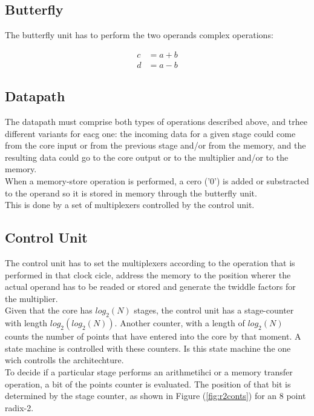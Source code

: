 \documentclass[conference]{IEEEtran}
\begin{document}
\subsection{Butterfly}

The butterfly unit has to perform the two operands complex operations:

\begin{equation}
\begin{split}
c &= a+b \\
d &= a-b
\end{split}
\label{eq:butterf}
\end{equation}

\subsection{Datapath}

The datapath must comprise both types of operations described above, and trhee different variants for eacg one: the incoming data for a given stage could
come from the core input or from the previous stage and/or from the memory, and the resulting data could go to the core output or to the
multiplier and/or to the memory.\\
When a memory-store operation is performed, a cero ('0') is added or substracted to the operand so it is stored in memory through the 
butterfly unit.\\
This is done by a set of multiplexers controlled by the control unit.   

\subsection{Control Unit}

The control unit has to set the multiplexers according to the operation that is performed in that clock cicle, address the memory to the 
position wherer the actual operand has to be readed or stored and generate the twiddle factors for the multiplier.\\
Given that the core has $log_2(N)$ stages, the control unit has a stage-counter with length $log_2(log_2(N))$. Another counter, with a
length of $log_2(N)$ counts the number of points that have entered into the core by that moment. A state machine is controlled with 
these counters. Is this state machine the one wich controlls the architechture.\\

To decide if a particular stage performs an arithmetihci or a memory transfer operation, a bit of the points counter is evaluated. 
The position of that bit is determined by the stage counter, as shown in Figure (\ref{fig:r2conts}) for an 8 point radix-2.
\end{document}
